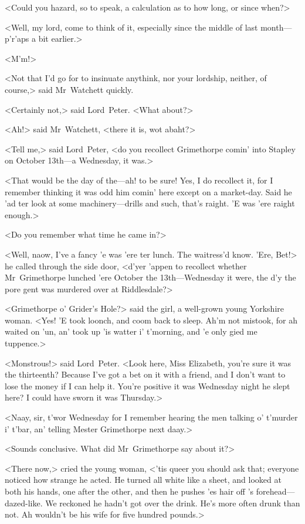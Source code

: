 <Could you hazard, so to speak, a calculation as to how long, or since when?>

<Well, my lord, come to think of it, especially since the middle of last month—p'r'aps a bit earlier.>

<M'm!>

<Not that I'd go for to insinuate anythink, nor your lordship, neither, of course,> said Mr~Watchett quickly.

<Certainly not,> said Lord~Peter. <What about?>

<Ah!> said Mr~Watchett, <there it is, wot abaht?>

<Tell me,> said Lord~Peter, <do you recollect Grimethorpe comin' into Stapley on October 13th—a Wednesday, it was.>

<That would be the day of the—ah! to be sure! Yes, I do recollect it, for I remember thinking it was odd him comin' here except on a market-day. Said he 'ad ter look at some machinery—drills and such, that's raight. 'E was 'ere raight enough.>

<Do you remember what time he came in?>

<Well, naow, I've a fancy 'e was 'ere ter lunch. The waitress'd know. 'Ere, Bet!> he called through the side door, <d'yer 'appen to recollect whether Mr~Grimethorpe lunched 'ere October the 13th—Wednesday it were, the d'y the pore gent was murdered over at Riddlesdale?>

<Grimethorpe o' Grider's Hole?> said the girl, a well-grown young Yorkshire woman. <Yes! 'E took loonch, and coom back to sleep. Ah'm not mistook, for ah waited on 'un, an' took up 'is watter i' t'morning, and 'e only gied me tuppence.>

<Monstrous!> said Lord~Peter. <Look here, Miss Elizabeth, you're sure it was the thirteenth? Because I've got a bet on it with a friend, and I don't want to lose the money if I can help it. You're positive it was Wednesday night he slept here? I could have sworn it was Thursday.>

<Naay, sir, t'wor Wednesday for I remember hearing the men talking o' t'murder i' t'bar, an' telling Mester Grimethorpe next daay.>

<Sounds conclusive. What did Mr~Grimethorpe say about it?>

<There now,> cried the young woman, <'tis queer you should ask that; everyone noticed how strange he acted. He turned all white like a sheet, and looked at both his hands, one after the other, and then he pushes 'es hair off 's forehead—dazed-like. We reckoned he hadn't got over the drink. He's more often drunk than not. Ah wouldn't be his wife for five hundred pounds.>

